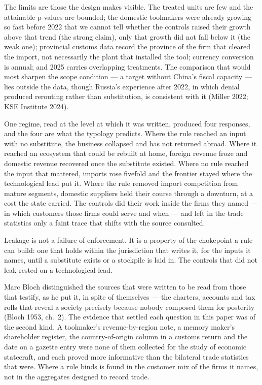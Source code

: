 \documentclass[12pt]{article}
\begin{document}
The limits are those the design makes visible. The treated units are few and the attainable p-values are bounded; the domestic toolmakers were already growing so fast before 2022 that we cannot tell whether the controls raised their growth above that trend (the strong claim), only that growth did not fall below it (the weak one); provincial customs data record the province of the firm that cleared the import, not necessarily the plant that installed the tool; currency conversion is annual; and 2025 carries overlapping treatments. The comparison that would most sharpen the scope condition --- a target without China's fiscal capacity --- lies outside the data, though Russia's experience after 2022, in which denial produced rerouting rather than substitution, is consistent with it (Miller 2022; KSE Institute 2024).

One regime, read at the level at which it was written, produced four responses, and the four are what the typology predicts. Where the rule reached an input with no substitute, the business collapsed and has not returned abroad. Where it reached an ecosystem that could be rebuilt at home, foreign revenue froze and domestic revenue recovered once the substitute existed. Where no rule reached the input that mattered, imports rose fivefold and the frontier stayed where the technological lead put it. Where the rule removed import competition from mature segments, domestic suppliers held their course through a downturn, at a cost the state carried. The controls did their work inside the firms they named --- in which customers those firms could serve and when --- and left in the trade statistics only a faint trace that shifts with the source consulted.

Leakage is not a failure of enforcement. It is a property of the chokepoint a rule can build: one that holds within the jurisdiction that writes it, for the inputs it names, until a substitute exists or a stockpile is laid in. The controls that did not leak rested on a technological lead.

Marc Bloch distinguished the sources that were written to be read from those that testify, as he put it, in spite of themselves --- the charters, accounts and tax rolls that reveal a society precisely because nobody composed them for posterity (Bloch 1953, ch.~2). The evidence that settled each question in this paper was of the second kind. A toolmaker's revenue-by-region note, a memory maker's shareholder register, the country-of-origin column in a customs return and the date on a gazette entry were none of them collected for the study of economic statecraft, and each proved more informative than the bilateral trade statistics that were. Where a rule binds is found in the customer mix of the firms it names, not in the aggregates designed to record trade.
\end{document}
